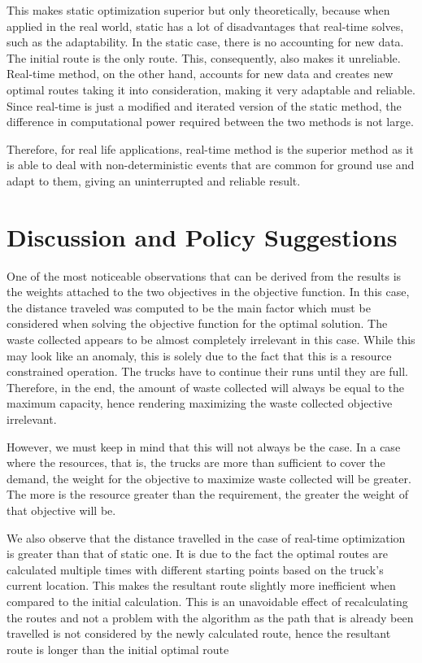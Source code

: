 \documentclass[12pt]{article}
\begin{document}
This makes static optimization superior but only theoretically, because when applied in the real world, static has a lot of disadvantages that real-time solves, such as the adaptability. In the static case, there is no accounting for new data. The initial route is the only route. This, consequently, also makes it unreliable. Real-time method, on the other hand, accounts for new data and creates new optimal routes taking it into consideration, making it very adaptable and reliable. Since real-time is just a modified and iterated version of the static method, the difference in computational power required between the two methods is not large. 

Therefore, for real life applications, real-time method is the superior method as it is able to deal with non-deterministic events that are common for ground use and adapt to them, giving an uninterrupted and reliable result.


\section{Discussion and Policy Suggestions}
One of the most noticeable observations that can be derived from the results is the weights attached to the two objectives in the objective function. In this case, the distance traveled was computed to be the main factor which must be considered when solving the objective function for the optimal solution. The waste collected appears to be almost completely irrelevant in this case. While this may look like an anomaly, this is solely due to the fact that this is a resource constrained operation. The trucks  have to continue their runs until they are full. Therefore, in the end, the amount of waste collected will always be equal to the maximum capacity, hence rendering maximizing the waste collected objective irrelevant.

However, we must keep in mind that this will not always be the case. In a case where the resources, that is, the trucks are more than sufficient to cover the demand, the weight for the objective to maximize waste collected will be greater. The more is the resource greater than the requirement, the greater the weight of that objective will be.

We also observe that the distance travelled in the case of real-time optimization is greater than that of static one. It is due to the fact the optimal routes are calculated multiple times with different starting points based on the truck's current location. This makes the resultant route slightly more inefficient when compared to the initial calculation. This is an unavoidable effect of recalculating the routes and not a problem with the algorithm as the path that is already been travelled is not considered by the newly calculated route, hence the resultant route is longer than the initial optimal route
\end{document}
